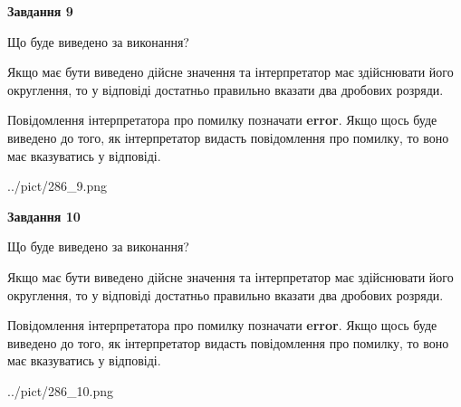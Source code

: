 \documentclass[12pt, ukrainian]{article}
\begin{document}
{\begin {Large}
{\begin {center}\textbf{Завдання 9}\end {center}}\par
Що буде виведено за виконання? \par

Якщо має бути виведено дійсне значення та інтерпретатор має здійснювати його округлення, 
то у відповіді достатньо правильно вказати два дробових розряди.

Повідомлення інтерпретатора про помилку позначати \textbf{error}.
Якщо щось буде виведено до того, як інтерпретатор видасть повідомлення про помилку, 
то воно має вказуватись у відповіді. \par

\begin{center}
	{../pict/286_9.png}
\end{center}
\newpage

{\begin {center}\textbf{Завдання 10}\end {center}}\par
Що буде виведено за виконання? \par

Якщо має бути виведено дійсне значення та інтерпретатор має здійснювати його округлення, 
то у відповіді достатньо правильно вказати два дробових розряди.

Повідомлення інтерпретатора про помилку позначати \textbf{error}.
Якщо щось буде виведено до того, як інтерпретатор видасть повідомлення про помилку, 
то воно має вказуватись у відповіді. \par

\begin{center}
	{../pict/286_10.png}
\end{center}
\newpage

\end {Large}}
\end{document}
